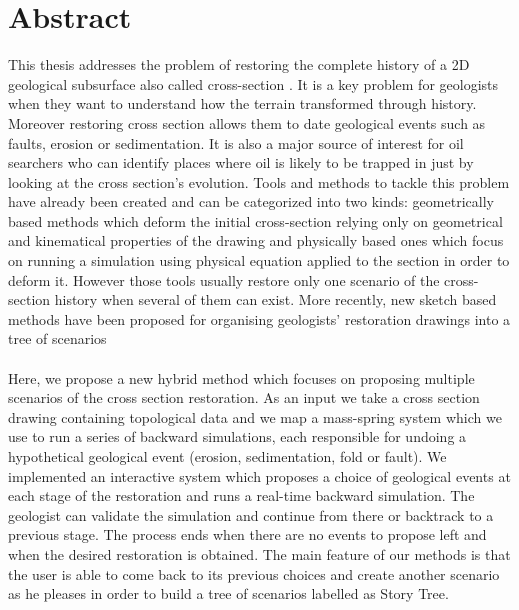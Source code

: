 \documentclass[12pt, a4paper]{report} %
\begin{document}



\chapter*{Abstract}

This thesis addresses the problem of restoring the complete history of a 2D geological 
subsurface also called cross-section \cite{BalancedCrossSections}. It is a key problem for geologists when they want to understand how the terrain transformed through history. Moreover restoring cross section allows them to date geological events such as faults, erosion or sedimentation. It is also a major source of interest for oil searchers who can identify places where oil is likely to be trapped in just by looking at the cross section's evolution. Tools and methods to tackle this problem have already been created and can  be categorized into two kinds: geometrically based methods which deform the initial cross-section relying only on geometrical and kinematical properties of the drawing and physically based ones which focus on running a simulation using physical equation applied to the section in order to deform it. However those tools usually restore only one scenario of the cross-section history when several of them can exist. More recently, new sketch based methods have been proposed for organising geologists' restoration drawings into a tree of scenarios\\\\
 Here, we propose a new hybrid method which focuses on proposing multiple scenarios of the cross section restoration. As an input we take a cross section drawing containing topological data and we map a mass-spring system which we use to run a series of backward simulations, each responsible for undoing a hypothetical geological event (erosion, sedimentation, fold or fault). We implemented an interactive system which proposes a choice of geological events
at each stage of the restoration and runs a real-time backward simulation. The geologist can validate the simulation and continue from there or backtrack to a previous stage. The process ends when there are no events to propose left and when the desired restoration is obtained. The main feature of our methods is that the user is able to come back to its previous choices and create another scenario as he pleases in order to build a tree of scenarios labelled as Story Tree.\\\\
\newpage
\end{document}

